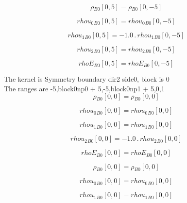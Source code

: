 \documentclass{article}
\begin{document}
\begin{dmath}{\rho{_{B0}}}[{0,5}] = {\rho{_{B0}}}[{0,-5}]\end{dmath}

\begin{dmath}{rhou_{0}{_{B0}}}[{0,5}] = {rhou_{0}{_{B0}}}[{0,-5}]\end{dmath}

\begin{dmath}{rhou_{1}{_{B0}}}[{0,5}] = - 1.0 \,.\, {rhou_{1}{_{B0}}}[{0,-5}]\end{dmath}

\begin{dmath}{rhou_{2}{_{B0}}}[{0,5}] = {rhou_{2}{_{B0}}}[{0,-5}]\end{dmath}

\begin{dmath}{rhoE{_{B0}}}[{0,5}] = {rhoE{_{B0}}}[{0,-5}]\end{dmath}

\noindent The kernel is Symmetry boundary dir2 side0, block is 0\\\noindent The ranges are -5,block0np0 + 5,-5,block0np1 + 5,0,1\\\begin{dmath}{\rho{_{B0}}}[{0,0}] = {\rho{_{B0}}}[{0,0}]\end{dmath}

\begin{dmath}{rhou_{0}{_{B0}}}[{0,0}] = {rhou_{0}{_{B0}}}[{0,0}]\end{dmath}

\begin{dmath}{rhou_{1}{_{B0}}}[{0,0}] = {rhou_{1}{_{B0}}}[{0,0}]\end{dmath}

\begin{dmath}{rhou_{2}{_{B0}}}[{0,0}] = - 1.0 \,.\, {rhou_{2}{_{B0}}}[{0,0}]\end{dmath}

\begin{dmath}{rhoE{_{B0}}}[{0,0}] = {rhoE{_{B0}}}[{0,0}]\end{dmath}

\begin{dmath}{\rho{_{B0}}}[{0,0}] = {\rho{_{B0}}}[{0,0}]\end{dmath}

\begin{dmath}{rhou_{0}{_{B0}}}[{0,0}] = {rhou_{0}{_{B0}}}[{0,0}]\end{dmath}

\begin{dmath}{rhou_{1}{_{B0}}}[{0,0}] = {rhou_{1}{_{B0}}}[{0,0}]\end{dmath}
\end{document}
